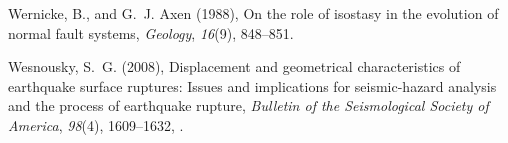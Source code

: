 \documentclass[twocolumn,grl]{AGUTeX}
\begin{document}
\begin{article}
\begin{thebibliography}{28}
Wernicke, B., and G.~J. Axen (1988), On the role of isostasy in the evolution
  of normal fault systems, \textit{Geology}, \textit{16}(9), 848--851.

Wesnousky, S.~G. (2008), Displacement and geometrical characteristics of
  earthquake surface ruptures: Issues and implications for seismic-hazard
  analysis and the process of earthquake rupture, \textit{Bulletin of the
  Seismological Society of America}, \textit{98}(4), 1609--1632,
  .

\end{thebibliography}



\end{article}


%
%
\end{document}
